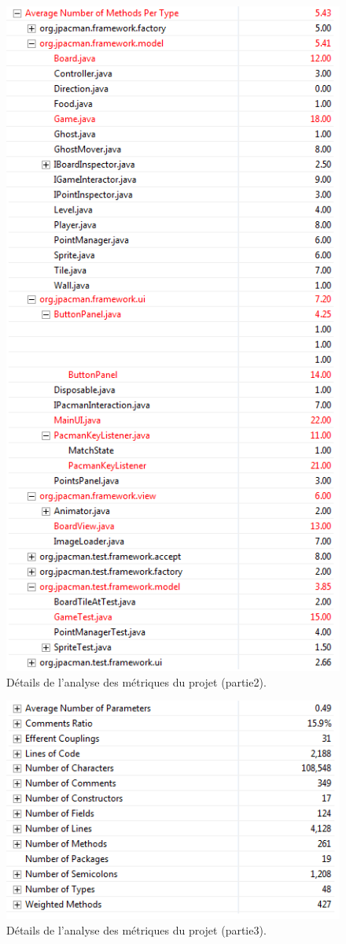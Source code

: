 \documentclass[12pt,a4paper,final]{article}
\begin{document}
\begin{figure}[!h]
	\centering
	\includegraphics[height=\textheight]{Metrique1.png}
	\caption{\label{métrique1}Détails de l'analyse des métriques du projet (partie2).}
\end{figure}
\begin{figure}[!h]
	\centering
	\includegraphics{Metrique2.png}
	\caption{\label{métrique2}Détails de l'analyse des métriques du projet (partie3).}
\end{figure}
\end{document}
